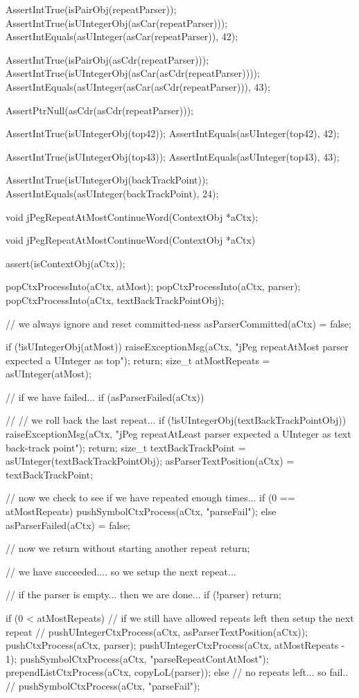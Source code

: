   AssertIntTrue(isPairObj(repeatParser));
  AssertIntTrue(isUIntegerObj(asCar(repeatParser)));
  AssertIntEquals(asUInteger(asCar(repeatParser)), 42);
  
  AssertIntTrue(isPairObj(asCdr(repeatParser)));
  AssertIntTrue(isUIntegerObj(asCar(asCdr(repeatParser))));
  AssertIntEquals(asUInteger(asCar(asCdr(repeatParser))), 43);
  
  AssertPtrNull(asCdr(asCdr(repeatParser)));
  
  AssertIntTrue(isUIntegerObj(top42));
  AssertIntEquals(asUInteger(top42), 42);  

  AssertIntTrue(isUIntegerObj(top43));
  AssertIntEquals(asUInteger(top43), 43);
  
  AssertIntTrue(isUIntegerObj(backTrackPoint));
  AssertIntEquals(asUInteger(backTrackPoint), 24);
\stopCTest
\stopTestCase
\stopTestSuite

\startTestSuite[jPegRepeatAtMostContinueWord]

\startCHeader
void jPegRepeatAtMostContinueWord(ContextObj *aCtx);
\stopCHeader

\startCCode
void jPegRepeatAtMostContinueWord(ContextObj *aCtx) {
  assert(isContextObj(aCtx));

  popCtxProcessInto(aCtx, atMost);
  popCtxProcessInto(aCtx, parser);
  popCtxProcessInto(aCtx, textBackTrackPointObj);

  // we always ignore and reset committed-ness
  asParserCommitted(aCtx) = false;

  if (!isUIntegerObj(atMost)) {
    raiseExceptionMsg(aCtx,
      "jPeg repeatAtMost parser expected a UInteger as top");
    return;
  }
  size_t atMostRepeats = asUInteger(atMost);

  // if we have failed...
  if (asParserFailed(aCtx)) {
    //
    // we roll back the last repeat...
    if (!isUIntegerObj(textBackTrackPointObj)) {
      raiseExceptionMsg(aCtx,
        "jPeg repeatAtLeast parser expected a UInteger as text back-track point");
      return;
    }
    size_t textBackTrackPoint = asUInteger(textBackTrackPointObj);
    asParserTextPosition(aCtx) = textBackTrackPoint;
       
    // now we check to see if we have repeated enough times...
     if (0 == atMostRepeats) {
       pushSymbolCtxProcess(aCtx, "parseFail");
     } else {
      asParserFailed(aCtx) = false;
     }
    
    // now we return without starting another repeat
    return;
  }
  
  // we have succeeded.... so we setup the next repeat...
  
  // if the parser is empty... then we are done...
  if (!parser) return;

  if (0 < atMostRepeats) {
    // if we still have allowed repeats left then setup the next repeat
    //
    pushUIntegerCtxProcess(aCtx, asParserTextPosition(aCtx));
    pushCtxProcess(aCtx, parser);
    pushUIntegerCtxProcess(aCtx, atMostRepeats - 1);
    pushSymbolCtxProcess(aCtx, "parseRepeatContAtMost");
    prependListCtxProcess(aCtx, copyLoL(parser));
  } else {
    // no repeats left... so fail..
    //
    pushSymbolCtxProcess(aCtx, "parseFail");
  }
}
\stopCCode

